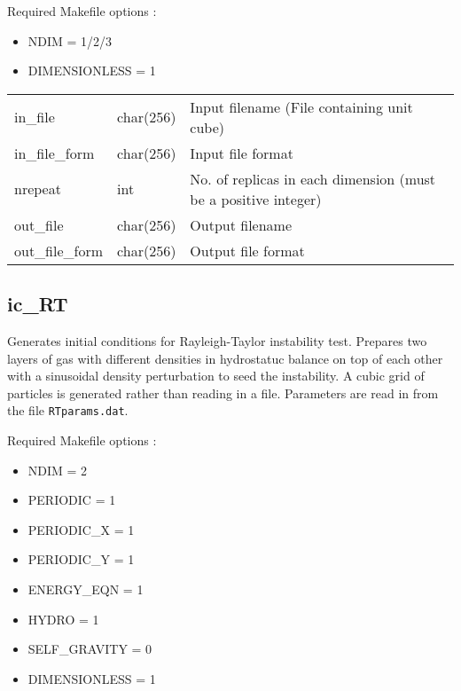 \documentclass[a4paper]{article}
\newcommand{\var}[1]{\texttt{#1}}
\begin{document}
\noindent Required Makefile options :
\begin{itemize}
\item NDIM = 1/2/3
\item DIMENSIONLESS = 1
\end{itemize}

\vspace{0.1cm}

\begin{center}
\begin{supertabular}{|p{3cm}|p{2cm}|p{8cm}|}
in\_file         & char(256) & Input filename (File containing unit cube) \\
in\_file\_form   & char(256) & Input file format \\
nrepeat          & int       & No. of replicas in each dimension 
                               (must be a positive integer) \\
out\_file        & char(256) & Output filename \\
out\_file\_form  & char(256) & Output file format \\
\end{supertabular}
\end{center}

\newpage



\subsection{ic\_RT}
Generates initial conditions for Rayleigh-Taylor instability test.  Prepares two layers of gas with different densities in hydrostatuc balance on top of each other with a sinusoidal density perturbation to seed the instability.  A cubic grid of particles is generated rather than reading in a file.  Parameters are read in from the file \var{RTparams.dat}. \newline

\noindent Required Makefile options :
\begin{itemize}
\item NDIM = 2
\item PERIODIC = 1
\item PERIODIC\_X = 1
\item PERIODIC\_Y = 1
\item ENERGY\_EQN = 1
\item HYDRO = 1
\item SELF\_GRAVITY = 0
\item DIMENSIONLESS = 1
\end{itemize}
\end{document}
